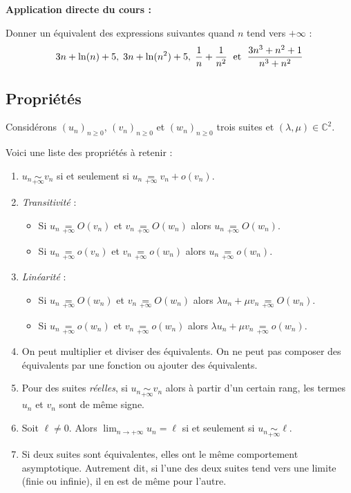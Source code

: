 \documentclass[french,11pt,twoside]{VcCours}
\newenvironment{ApplicationDirecte}{\textbf{Application directe du cours :}

}{}
\begin{document}
\begin{ApplicationDirecte} Donner un équivalent des expressions suivantes quand $n$ tend vers $+ \infty$ :
$$ 3n+\ln(n)+5, \;  3n+\ln(n^2)+5, \; \dfrac{1}{n} + \dfrac{1}{n^2} \; \hbox{ et } \; \dfrac{3n^3+n^2+1}{n^3+n^2}$$
\end{ApplicationDirecte}

\subsection{Propriétés}

 Considérons $(u_n)_{n \geq 0}$, $(v_n)_{n \geq 0}$ et $(w_n)_{n \geq 0}$ trois suites et $(\lambda, \mu) \in \mathbb{C}^2$.

Voici une liste des propriétés à retenir :

\begin{enumerate}
\item $u_n  \underset{+ \infty}{\sim} v_n $ si et seulement si $u_n \underset{+ \infty}{=} v_n + o(v_n)$.
\item \emph{Transitivité} : 
\begin{itemize}
\item Si $u_n   \underset{+ \infty}{=}O(v_n)$ et $v_n   \underset{+ \infty}{=}O(w_n)$ alors $u_n   \underset{+ \infty}{=}O(w_n)$.
\item Si $u_n   \underset{+ \infty}{=}o(v_n)$ et $v_n   \underset{+ \infty}{=}o(w_n)$ alors $u_n   \underset{+ \infty}{=}o(w_n)$.
\end{itemize}
\item \emph{Linéarité} : 
\begin{itemize}
\item Si $u_n  \underset{+ \infty}{=}O(w_n)$ et $v_n \underset{+ \infty}{=}O(w_n)$ alors $\lambda u_n + \mu v_n  \underset{+ \infty}{=}O(w_n)$.
\item Si $u_n  \underset{+ \infty}{=}o(w_n)$ et $v_n \underset{+ \infty}{=}o(w_n)$ alors $\lambda u_n + \mu v_n  \underset{+ \infty}{=}o(w_n)$.
\end{itemize}
\item On peut multiplier et diviser des équivalents. On ne peut pas composer des équivalents par une fonction ou ajouter des équivalents.
\item Pour des suites \emph{réelles}, si $u_n  \underset{+ \infty}{\sim} v_n $ alors à partir d'un certain rang, les termes $u_n$ et $v_n$ sont de même signe. 

\begin{Demonstration}{}

\vspace{7cm}
\end{Demonstration}
\item Soit $\ell \neq 0$. Alors $\lim_{n \rightarrow + \infty} u_n = \ell$ si et seulement si $u_n \underset{+ \infty}{\sim} \ell$.
\item Si deux suites sont équivalentes, elles ont le même comportement asymptotique. Autrement dit, si l'une des deux suites tend vers une limite (finie ou infinie), il en est de même pour l'autre.
\end{enumerate}
\end{document}
